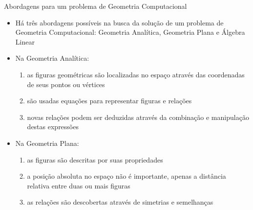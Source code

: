 \begin{frame}[fragile]{Abordagens para um problema de Geometria Computacional}

    \begin{itemize}
        \item Há três abordagens possíveis na busca da solução de um problema de Geometria
        Computacional: Geometria Analítica, Geometria Plana e Álgebra Linear
        \pause

        \item Na Geometria Analítica:
        \pause

        \begin{enumerate}
            \item as figuras geométricas são localizadas no espaço através das coordenadas de seus pontos ou vértices
        \pause
            \item são usadas equações para representar figuras e relações
        \pause
            \item novas relações podem ser deduzidas através da combinação e manipulação destas expressões
        \end {enumerate}
        \pause

        \item Na Geometria Plana: 
        \pause

        \begin{enumerate}
            \item as figuras são descritas por suas propriedades
        \pause
            \item a posição absoluta no espaço não é importante, apenas a distância relativa entre duas ou mais figuras
        \pause
            \item as relações são descobertas através de simetrias e semelhanças
        \end{enumerate}
    \end{itemize}

\end{frame}

